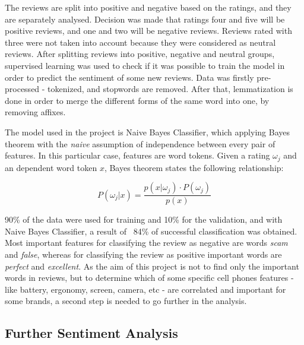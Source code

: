 \documentclass[11pt]{article}
\begin{document}
  The reviews are split into positive and negative based on the ratings, and they are separately analysed. Decision was made that ratings four and five will be positive reviews, and one and two will be negative reviews. Reviews rated with three were not taken into account because they were considered as neutral reviews. After splitting reviews into positive, negative and neutral groups, supervised learning was used to check if it was possible to train the model in order to predict the sentiment of some new reviews. Data was firstly pre-processed - tokenized, and stopwords are removed. After that, lemmatization is done in order to merge the different forms of the same word into one, by removing affixes. \par
  
  
  
  The model used in the project is Naive Bayes Classifier, which applying Bayes theorem with the \textit{naive} assumption of independence between every pair of features. In this particular case, features are word tokens. Given a rating $\omega_j$ and an dependent word token $x$, Bayes theorem states the following relationship:
  
  \begin{equation}
  \label{eq:bayes}
   P(\omega_j|x) = \frac{p(x|\omega_j) \cdot P(\omega_j)}{p(x)}
  \end{equation}\par\par
  
  
  90\% of the data were used for training and 10\% for the validation, and with Naive Bayes Classifier, a result of ~84\% of successful classification was obtained. Most important features for classifying the review as negative are words \textit{scam} and \textit{false}, whereas for classifying the review as positive important words are \textit{perfect} and \textit{excellent}. As the aim of this project is not to find only the important words in reviews, but to determine which of some specific cell phones features - like battery, ergonomy, screen, camera, etc - are correlated and important for some brands, a second step is needed to go further in the analysis.
  
  
  \subsection{Further Sentiment Analysis} 
  
\end{document}
